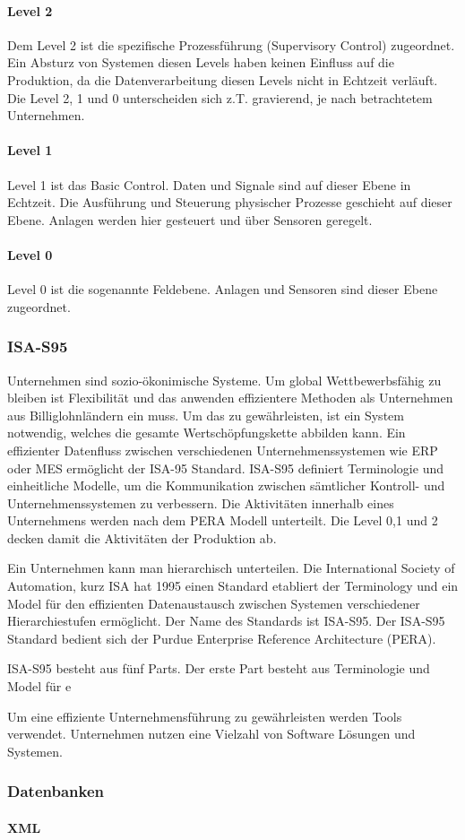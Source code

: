 \paragraph{Level 2} Dem Level 2 ist die spezifische Prozessführung (Supervisory Control) zugeordnet. Ein Absturz von Systemen diesen Levels haben keinen Einfluss auf die Produktion, da die Datenverarbeitung diesen Levels nicht in Echtzeit verläuft. Die Level 2, 1 und 0 unterscheiden sich z.T. gravierend, je nach betrachtetem Unternehmen.

\paragraph{Level 1} Level 1 ist das Basic Control. Daten und Signale sind auf dieser Ebene in Echtzeit. Die Ausführung und Steuerung physischer Prozesse geschieht auf dieser Ebene. Anlagen werden hier gesteuert und über Sensoren geregelt.

\paragraph{Level 0} Level 0 ist die sogenannte Feldebene. Anlagen und Sensoren sind dieser Ebene zugeordnet.



\subsubsection{ISA-S95}

Unternehmen sind sozio-ökonimische Systeme. Um global Wettbewerbsfähig zu bleiben ist Flexibilität und das anwenden effizientere Methoden als Unternehmen aus Billiglohnländern ein muss. Um das zu gewährleisten, ist ein System notwendig, welches die gesamte Wertschöpfungskette abbilden kann. Ein effizienter Datenfluss zwischen verschiedenen Unternehmenssystemen wie ERP oder MES ermöglicht der ISA-95 Standard. ISA-S95 definiert Terminologie und einheitliche Modelle, um die Kommunikation zwischen sämtlicher Kontroll- und Unternehmenssystemen zu verbessern. Die Aktivitäten innerhalb eines Unternehmens werden nach dem PERA Modell unterteilt. Die Level 0,1 und 2 decken damit die Aktivitäten der Produktion ab.

Ein Unternehmen kann man hierarchisch unterteilen. Die International Society of Automation, kurz ISA hat 1995 einen Standard etabliert der Terminology und ein Model für den effizienten Datenaustausch zwischen Systemen verschiedener Hierarchiestufen ermöglicht. Der Name des Standards ist ISA-S95. Der ISA-S95 Standard bedient sich der Purdue Enterprise Reference Architecture (PERA). 

ISA-S95 besteht aus fünf Parts. Der erste Part besteht aus Terminologie und Model für e

Um eine effiziente Unternehmensführung zu gewährleisten werden Tools verwendet. Unternehmen nutzen eine Vielzahl von Software Lösungen und Systemen. 

\subsubsection{Datenbanken}

\paragraph{XML}

